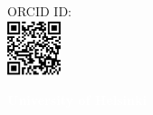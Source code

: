 \documentclass[8pt]{article}
\begin{document}
        \begin{flushright}
            \vspace{-25pt}
            \hspace{-2pt}
            ORCID ID:\\
            \hspace{-2pt}
			\includegraphics[height=45pt]{ORCID_QR_code.png}
        \end{flushright}
            \vspace{-26pt}
			\colorbox{thirdcol}{\hspace{9pt}\small{\textcolor{white}{\textbf{University of Helsinki}}\hspace{9pt}}}
\end{document}
